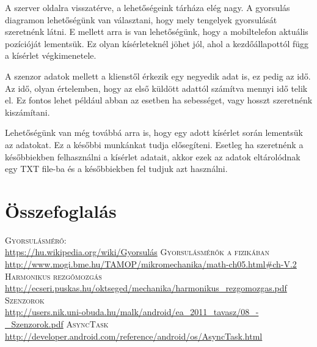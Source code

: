 \documentclass{thesis-ekf}
\theoremstyle{definition}
\theoremstyle{remark}
\begin{document}
\par A szerver oldalra visszatérve, a lehetőségeink tárháza elég nagy. A gyorsulás diagramon lehetőségünk van választani, hogy mely tengelyek gyorsulását szeretnénk látni. E mellett arra is van lehetőségünk, hogy a mobiltelefon aktuális pozícióját lementsük. Ez olyan kísérleteknél jöhet jól, ahol a kezdőállapottól függ a kísérlet végkimenetele.
\par A szenzor adatok mellett a klienstől érkezik egy negyedik adat is, ez pedig az idő. Az idő, olyan értelemben, hogy az első küldött adattól számítva mennyi idő telik el. Ez fontos lehet például abban az esetben ha sebességet, vagy hosszt szeretnénk kiszámítani.
\par Lehetőségünk van még továbbá arra is, hogy egy adott kísérlet során lementsük az adatokat. Ez a későbbi munkánkat tudja elősegíteni. Esetleg ha szeretnénk a későbbiekben felhasználni a kísérlet adatait, akkor ezek az adatok eltárolódnak egy TXT file-ba és a későbbiekben fel tudjuk azt használni.
\chapter{Összefoglalás}

\begin{thebibliography}{1}
 \textsc{Gyorsulásmérő}:\\\url{https://hu.wikipedia.org/wiki/Gyorsulás}
 \textsc{Gyorsulásmérők a fizikában}\\ \url{http://www.mogi.bme.hu/TAMOP/mikromechanika/math-ch05.html#ch-V.2}
 \textsc{Harmonikus rezgőmozgás}\\
\url{http://ecseri.puskas.hu/oktseged/mechanika/harmonikus_rezgomozgas.pdf}
 \textsc{Szenzorok}\\
\url{http://users.nik.uni-obuda.hu/malk/android/ea_2011_tavasz/08_-_Szenzorok.pdf}
 \textsc{AsyncTask}\\
\url{http://developer.android.com/reference/android/os/AsyncTask.html}
\end{thebibliography}
\end{document}
